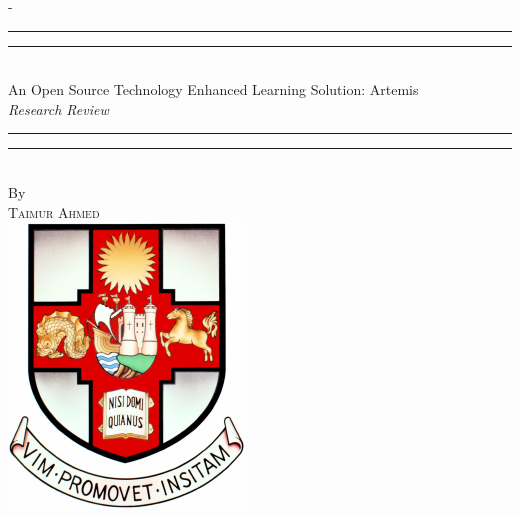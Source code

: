 %
%
% 
%
%
\begin{titlingpage}
\begin{SingleSpace}
\calccentering{\unitlength} 
\begin{adjustwidth*}{\unitlength}{-\unitlength}
\vspace*{13mm}
\begin{center}
\rule[0.5ex]{\linewidth}{2pt}\vspace*{-\baselineskip}\vspace*{3.2pt}
\rule[0.5ex]{\linewidth}{1pt}\\[\baselineskip]
{\HUGE An Open Source
Technology Enhanced Learning Solution: Artemis }\\[4mm]
{\Large \textit{Research Review}}\\
\rule[0.5ex]{\linewidth}{1pt}\vspace*{-\baselineskip}\vspace{3.2pt}
\rule[0.5ex]{\linewidth}{2pt}\\
\vspace{6.5mm}
{\large By}\\
\vspace{6.5mm}
{\large\textsc{Taimur Ahmed}}\\
\vspace{11mm}
\includegraphics[scale=0.6]{logos/bristolcrest_colour}\\

\end{center}
\end{adjustwidth*}
\end{SingleSpace}
\end{titlingpage}
